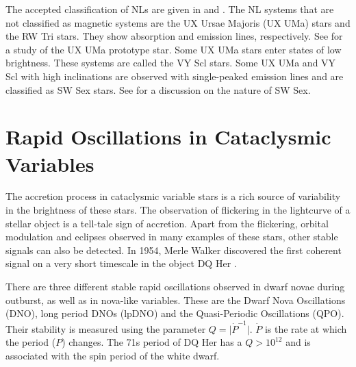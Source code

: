The accepted classification of NLs are given in \cite{dhillon_NL} and \cite{warnerbible}. The NL systems that are not classified as magnetic systems are the UX Ursae Majoris (UX UMa) stars and the RW Tri stars. They show absorption and emission lines, respectively. See \cite{Knigge_HST_UX_UMa} for a study of the UX UMa prototype star. Some UX UMa stars enter states of low brightness. These  systems are called the VY Scl stars. Some UX UMa and VY Scl with high inclinations are observed with single-peaked emission lines and are classified as SW Sex stars. See \cite{swsex} for a discussion on the nature of SW Sex.


\section{Rapid Oscillations in Cataclysmic Variables}

The accretion process in cataclysmic variable stars is a rich source of variability in the brightness of these stars. The observation of flickering in the lightcurve of a stellar object is a tell-tale sign of accretion. Apart from the flickering, orbital modulation and eclipses observed in many examples of these stars, other stable signals can also be detected. In 1954, Merle Walker discovered the first coherent signal on a very short timescale in the object DQ Her \citep{dqher}.

There are three different stable rapid oscillations observed in dwarf novae during outburst, as well as in nova-like variables. These are the Dwarf Nova Oscillations (DNO), long period DNOs (lpDNO) and the Quasi-Periodic Oscillations (QPO)\citep{warner_ro2004}. Their stability is measured using the parameter $Q = \vert \dot{P}^{-1} \vert$.  $\dot{P}$ is the rate at which the period ($P$) changes.  The 71s period of DQ Her has a $ Q >  10^{12} $ \citep{warnerbible} and is associated with the spin period of the white dwarf. 

